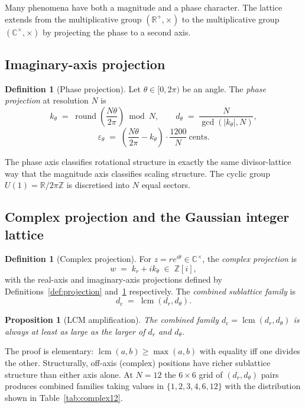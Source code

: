 \documentclass[11pt,a4paper]{article}
\newtheorem{proposition}[theorem]{Proposition}
\theoremstyle{definition}
\newtheorem{definition}[theorem]{Definition}
\theoremstyle{remark}
\newcommand{\R}{\mathbb{R}}
\newcommand{\Z}{\mathbb{Z}}
\newcommand{\C}{\mathbb{C}}
\DeclareMathOperator{\round}{round}
\DeclareMathOperator{\lcm}{lcm}
\newcommand{\eps}{\varepsilon}
\begin{document}
Many phenomena have both a magnitude and a phase character. The lattice extends from the multiplicative group $(\R^{+},\times)$ to the multiplicative group $(\C^{\times},\times)$ by projecting the phase to a second axis.

\subsection{Imaginary-axis projection}

\begin{definition}[Phase projection]\label{def:phase}
Let $\theta\in[0,2\pi)$ be an angle. The \emph{phase projection} at resolution $N$ is
\[
k_{\theta} \;=\; \round\!\left(\frac{N\theta}{2\pi}\right)\bmod N, \qquad d_{\theta} \;=\; \frac{N}{\gcd(|k_{\theta}|,N)},
\]
\[
\eps_{\theta} \;=\; \left(\frac{N\theta}{2\pi}-k_{\theta}\right)\cdot\frac{1200}{N}\ \text{cents}.
\]
\end{definition}

The phase axis classifies rotational structure in exactly the same divisor-lattice way that the magnitude axis classifies scaling structure. The cyclic group $U(1) = \R/2\pi\Z$ is discretised into $N$ equal sectors.

\subsection{Complex projection and the Gaussian integer lattice}

\begin{definition}[Complex projection]\label{def:complex}
For $z = r e^{i\theta}\in\C^{\times}$, the \emph{complex projection} is
\[
w \;=\; k_{r}+i k_{\theta} \;\in\; \Z[i],
\]
with the real-axis and imaginary-axis projections defined by Definitions~\ref{def:projection} and~\ref{def:phase} respectively. The \emph{combined sublattice family} is
\[
d_{\mathrm{c}} \;=\; \lcm(d_{r},d_{\theta}).
\]
\end{definition}

\begin{proposition}[LCM amplification]\label{prop:lcm}
The combined family $d_{\mathrm{c}}=\lcm(d_{r},d_{\theta})$ is always at least as large as the larger of $d_{r}$ and $d_{\theta}$.
\end{proposition}

The proof is elementary: $\lcm(a,b)\ge \max(a,b)$ with equality iff one divides the other. Structurally, off-axis (complex) positions have richer sublattice structure than either axis alone. At $N=12$ the $6\times 6$ grid of $(d_{r},d_{\theta})$ pairs produces combined families taking values in $\{1,2,3,4,6,12\}$ with the distribution shown in Table~\ref{tab:complex12}.
\end{document}
